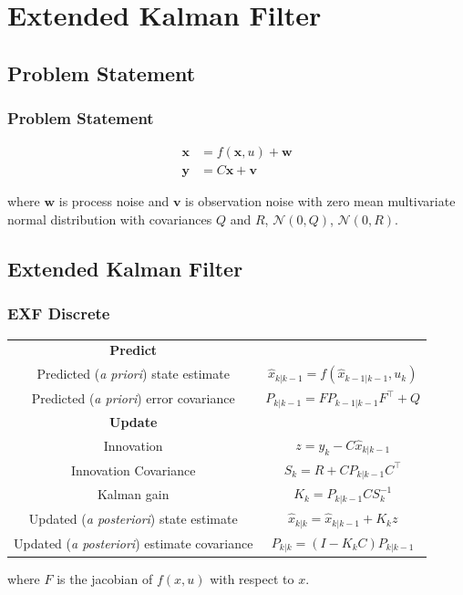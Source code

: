 \documentclass[10pt]{beamer}
\begin{document}
%

\section{Extended Kalman Filter}
\subsection{Problem Statement}
\begin{frame}

\frametitle{Problem Statement}

  \begin{align*}
  \mathbf{x} &= f(\mathbf{x},u) + \mathbf{w}\\
  \mathbf{y} &= C\mathbf{x} + \mathbf{v}
  \end{align*}

  where $\mathbf{w}$ is process noise and $\mathbf{v}$ is observation noise with zero mean multivariate normal distribution with covariances $Q$ and $R$, $\mathcal{N}(0,Q)$, $\mathcal{N}(0,R)$. \\
  \hspace{10pt}

\end{frame}

\subsection{Extended Kalman Filter}
\begin{frame}

\frametitle{EXF Discrete}

  \begin{tabular}{cc}
  \textbf{Predict} & \\
  Predicted (\textit{a priori}) state estimate & $\hat{x}_{k|k-1} = f(\hat{x}_{k-1|k-1},u_k)$  \\
  Predicted (\textit{a priori}) error covariance & $P_{k|k-1} = FP_{k-1|k-1}F^\top + Q$ \\

  \textbf{Update} & \\
  Innovation & $z = y_k - C\hat{x}_{k|k-1}$ \\
  Innovation Covariance & $S_k = R + CP_{k|k-1}C^\top$ \\
  Kalman gain & $K_k = P_{k|k-1}CS_k^{-1}$ \\
  Updated (\textit{a posteriori}) state estimate & $\hat{x}_{k|k} = \hat{x}_{k|k-1} + K_k z$ \\
  Updated (\textit{a posteriori}) estimate covariance & $P_{k|k} = (I - K_kC)P_{k|k-1}$ 
  \end{tabular} 

  where $F$ is the jacobian of $f(x,u)$ with respect to $x$. 

\end{frame}
\end{document}
